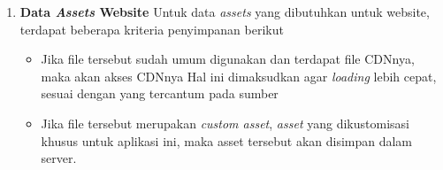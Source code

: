 \begin{enumerate}
    \item \textbf{Data \textit{Assets} Website}
    \newline
    Untuk data \textit{assets} yang dibutuhkan untuk website, terdapat beberapa kriteria penyimpanan berikut
    
      \begin{itemize}[noitemsep,topsep=0pt]
      \item Jika file tersebut sudah umum digunakan dan terdapat file CDNnya, maka akan akses CDNnya
      \newline
      Hal ini dimaksudkan agar \textit{loading} lebih cepat, sesuai dengan yang tercantum pada sumber \cite{sitepoint_7_2011}
      \item Jika file tersebut merupakan \textit{custom asset}, \textit{asset} yang dikustomisasi khusus untuk aplikasi ini, maka asset tersebut akan disimpan dalam server.
      \end{itemize}
    
    \end{enumerate}